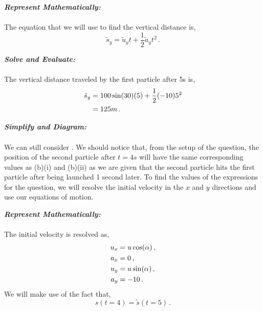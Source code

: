 \begin{subquestions}
\begin{subsubquestions}

\subsubquestion

\textbf{\textit{Represent Mathematically:}} \\ \\			
The equation that we will use to find the vertical distance is,
\begin{equation}
	\tilde{s}_y =\tilde{u}_yt + \frac{1}{2}\tilde{a}_yt^2 \,.	
\end{equation}




\textbf{\textit{Solve and Evaluate:}} \\ \\
The vertical distance traveled by the first particle after 5s is,
\begin{align}
	\tilde{s}_y & = 100\sin(30)(5) + \frac{1}{2}(-10)5^2 \nonumber \\
		& = 125m \,.
\end{align}


\subsubquestion

\textbf{\textit{Simplify and Diagram:}} \\ \\
We can still consider . We should notice that, from the setup of the question, the position of the second particle after $t=4s$ will have the same corresponding values as (b)(i) and (b)(ii) as we are given that the second particle hits the first particle after being launched 1 second later. To find the values of the expressions for the question, we will resolve the initial velocity in the $x$ and $y$ directions and use our equations of motion.




\textbf{\textit{Represent Mathematically:}} \\ \\
The initial velocity is resolved as,
\begin{align}
	u_x & = u\cos(\alpha) \,, \nonumber \\
	a_x & = 0 \,, \nonumber \\
	u_y & = u\sin(\alpha) \,, \nonumber \\
	a_y & = -10 \,.
\end{align}
We will make use of the fact that,
\begin{equation}
	s(t=4) = \tilde{s}(t=5) \,.
\end{equation}


\end{subsubquestions}
\end{subquestions}
